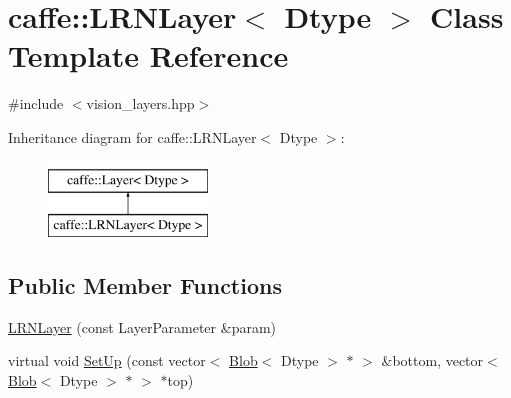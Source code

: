 \hypertarget{classcaffe_1_1_l_r_n_layer}{\section{caffe\+:\+:L\+R\+N\+Layer$<$ Dtype $>$ Class Template Reference}
\label{classcaffe_1_1_l_r_n_layer}
}


{\ttfamily \#include $<$vision\+\_\+layers.\+hpp$>$}

Inheritance diagram for caffe\+:\+:L\+R\+N\+Layer$<$ Dtype $>$\+:\begin{figure}[H]
\begin{center}
\leavevmode
\includegraphics[height=2.000000cm]{classcaffe_1_1_l_r_n_layer}
\end{center}
\end{figure}
\subsection*{Public Member Functions}
\begin{DoxyCompactItemize}
\item 
\hyperlink{classcaffe_1_1_l_r_n_layer_a235b5f1b8fead8d1ddb9c29d627058fe}{L\+R\+N\+Layer} (const Layer\+Parameter \&param)
\item 
virtual void \hyperlink{classcaffe_1_1_l_r_n_layer_a107b66d7985241c54d861cb9d940cfc1}{Set\+Up} (const vector$<$ \hyperlink{classcaffe_1_1_blob}{Blob}$<$ Dtype $>$ $\ast$ $>$ \&bottom, vector$<$ \hyperlink{classcaffe_1_1_blob}{Blob}$<$ Dtype $>$ $\ast$ $>$ $\ast$top)
\end{DoxyCompactItemize}
